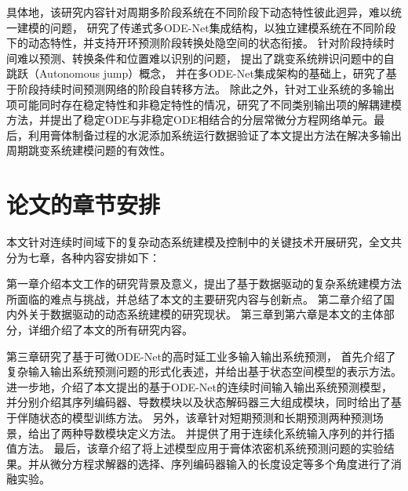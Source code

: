 具体地，该研究内容针对周期多阶段系统在不同阶段下动态特性彼此迥异，难以统一建模的问题，
研究了传递式多ODE-Net集成结构，以独立建模系统在不同阶段下的动态特性，并支持开环预测阶段转换处隐空间的状态衔接。
针对阶段持续时间难以预测、转换条件和位置难以识别的问题，
提出了跳变系统辨识问题中的自跳跃（Autonomous jump）概念，
并在多ODE-Net集成架构的基础上，研究了基于阶段持续时间预测网络的阶段自转移方法。
除此之外，针对工业系统的多输出项可能同时存在稳定特性和非稳定特性的情况，研究了不同类别输出项的解耦建模方法，并提出了稳定ODE与非稳定ODE相结合的分层常微分方程网络单元。最后，利用膏体制备过程的水泥添加系统运行数据验证了本文提出方法在解决多输出周期跳变系统建模问题的有效性。


\section{论文的章节安排}

本文针对连续时间域下的复杂动态系统建模及控制中的关键技术开展研究，全文共分为七章，各种内容安排如下：

第一章介绍本文工作的研究背景及意义，提出了基于数据驱动的复杂系统建模方法所面临的难点与挑战，并总结了本文的主要研究内容与创新点。
第二章介绍了国内外关于数据驱动的动态系统建模的研究现状。
第三章到第六章是本文的主体部分，详细介绍了本文的所有研究内容。


第三章研究了基于可微ODE-Net的高时延工业多输入输出系统预测，
首先介绍了复杂输入输出系统预测问题的形式化表述，并给出基于状态空间模型的表示方法。
进一步地，介绍了本文提出的基于ODE-Net的连续时间输入输出系统预测模型，并分别介绍其序列编码器、导数模块以及状态解码器三大组成模块，同时给出了基于伴随状态的模型训练方法。
另外，该章针对短期预测和长期预测两种预测场景，给出了两种导数模块定义方法。
并提供了用于连续化系统输入序列的并行插值方法。
最后，该章介绍了将上述模型应用于膏体浓密机系统预测问题的实验结果。并从微分方程求解器的选择、序列编码器输入的长度设定等多个角度进行了消融实验。




